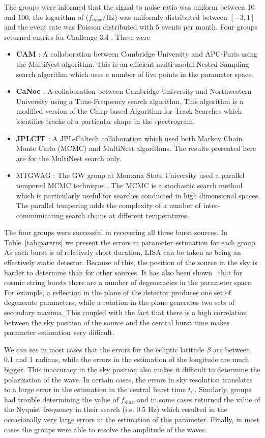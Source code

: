 \documentclass{iopart}
\begin{document}
The groups were informed that the signal to noise ratio was uniform between 10 and 100, the logarithm of ($f_{max}/$Hz) was uniformly distributed between $[-3,1]$ and the event rate was Poisson distributed with 5 events per month.  Four groups returned entries for Challenge 3.4 .  These were
\begin{itemize}
\item \textbf{CAM} :  A collaboration between Cambridge University and APC-Paris using the MultiNest algorithm. This is an efficient multi-modal
Nested Sampling search algorithm which uses a number of live points in the parameter space.  
\item \textbf{CaNoe} : A collaboration between Cambridge University and Northwestern University using a Time-Frequency search algorithm. This algorithm is a modified
version of the Chirp-based Algorithm for Track Searches which identifies tracks of a particular shape in the spectrogram.
\item \textbf{JPLCIT} : A JPL-Caltech collaboration which used both Markov Chain Monte Carlo (MCMC) and MultiNest algorithms.  The results presented here are for 
the MultiNest search only.
\item MTGWAG : The GW group at Montana State University used a parallel tempered MCMC technique~\cite{keycornish}.  The MCMC is a stochastic search method which is particularly
useful for searches conducted in high dimensional spaces.  The parallel tempering adds the complexity of a number of inter-communicating search
chains at different temperatures.
\end{itemize}

The four groups were successful in recovering all three burst sources.  In Table~\ref{tab:parerrs} we present the errors in parameter estimation for each group.  As each burst is of relatively short duration, LISA can be taken as being an effectively static detector.  Because of this, the position of the source in the sky is harder to determine than for other sources.  It has also been shown~\cite{keycornish} that for cosmic string bursts there are a number of degeneracies in the parameter space.  For example, a reflection in the plane of the detector produces one set of degenerate parameters, while a rotation in the plane generates two sets of secondary maxima.  This coupled with the fact that there is a high correlation between the sky position of the source and the central burst time makes parameter estimation very difficult.  

We can see in most cases that the errors for the ecliptic latitude $\beta$ are between 0.1 and 1 radians, while the errors in the estimation of the longitude are much bigger.  This inaccuracy in the sky position also makes it difficult to determine the polarization of the wave.  In certain cases, the errors in sky resolution translates to a large error in the estimation in the central burst time $t_C$.   Similarly, groups had trouble determining the value of $f_{max}$ and in some cases returned the value of the Nyquist frequency in their search (i.e. 0.5 Hz) which resulted in the occasionally very large errors in the estimation of this parameter. Finally, in most cases the groups were able to resolve the amplitude of the waves.
\end{document}
